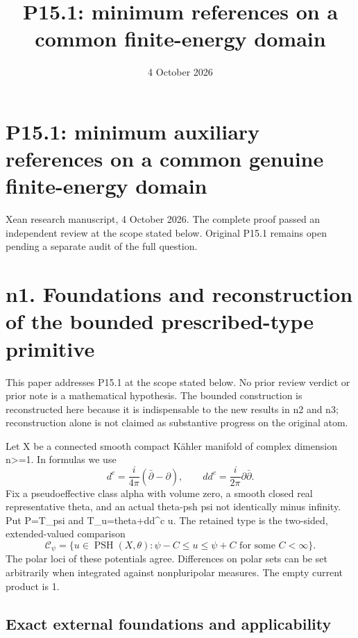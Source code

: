 \documentclass[
]{article}
\title{P15.1: minimum references on a common finite-energy domain}
\author{}
\date{4 October 2026}
\begin{document}
\maketitle

\section{P15.1: minimum auxiliary references on a common genuine
finite-energy
domain}\label{p15.1-minimum-auxiliary-references-on-a-common-genuine-finite-energy-domain}

Xean research manuscript, 4 October 2026. The complete proof passed an
independent review at the scope stated below. Original P15.1 remains open
pending a separate audit of the full question.

\section{n1. Foundations and reconstruction of the bounded
prescribed-type
primitive}\label{n1.-foundations-and-reconstruction-of-the-bounded-prescribed-type-primitive}

This paper addresses P15.1 at the scope stated below. No prior review
verdict or prior note is a mathematical hypothesis. The bounded construction
is reconstructed here because it is indispensable to the new results in
n2 and n3; reconstruction alone is not claimed as substantive progress
on the original atom.

Let X be a connected smooth compact Kähler manifold of complex dimension
n\textgreater=1. In formulas we use \[
d^c=\frac{i}{4\pi}(\bar\partial-\partial),\qquad dd^c=\frac{i}{2\pi}\partial\bar\partial.
\] Fix a pseudoeffective class alpha with volume zero, a smooth closed
real representative theta, and an actual theta-psh psi not identically
minus infinity. Put P=T\_psi and T\_u=theta+dd\^{}c u. The retained type
is the two-sided, extended-valued comparison \[
\mathcal{C}_\psi=\{u\in\operatorname{PSH}(X,\theta):\psi-C\leq u\leq\psi+C
\text{ for some }C<\infty\}.
\] The polar loci of these potentials agree. Differences on polar sets
can be set arbitrarily when integrated against nonpluripolar measures.
The empty current product is 1.

\subsection{Exact external foundations and
applicability}\label{exact-external-foundations-and-applicability}
\end{document}
